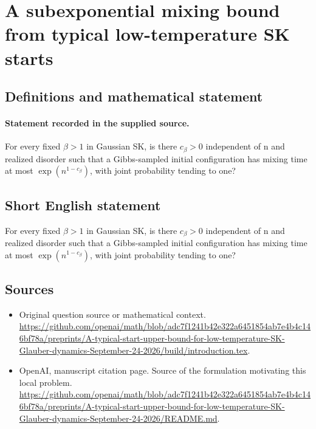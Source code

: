 \documentclass[11pt]{article}
\begin{document}
\section*{A subexponential mixing bound from typical low-temperature SK starts}\label{30007395}
\subsection{Definitions and mathematical statement}
\paragraph{Statement recorded in the supplied source.}
For every fixed $\beta >1$ in Gaussian SK, is there $c_\beta >0$ independent of n and realized disorder such that a Gibbs-sampled initial configuration has mixing time at most $\exp (n^{1-c_\beta })$, with joint probability tending to one?
\subsection{Short English statement}
For every fixed $\beta >1$ in Gaussian SK, is there $c_\beta >0$ independent of n and realized disorder such that a Gibbs-sampled initial configuration has mixing time at most $\exp (n^{1-c_\beta })$, with joint probability tending to one?
\subsection{Sources}
\begin{itemize}
\item[S1] Original question source or mathematical context.
\url{https://github.com/openai/math/blob/adc7f1241b42e322a6451854ab7e4b4c146bf78a/preprints/A-typical-start-upper-bound-for-low-temperature-SK-Glauber-dynamics-September-24-2026/build/introduction.tex}.
\item[S2] OpenAI, manuscript citation page. Source of the formulation motivating this local problem.
\url{https://github.com/openai/math/blob/adc7f1241b42e322a6451854ab7e4b4c146bf78a/preprints/A-typical-start-upper-bound-for-low-temperature-SK-Glauber-dynamics-September-24-2026/README.md}.
\end{itemize}
\end{document}

